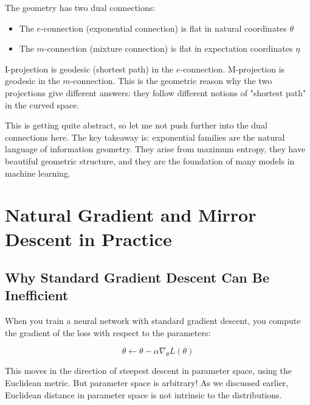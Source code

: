 \vspace{1em}

The geometry has two dual connections:

\begin{itemize}
\item The $e$-connection (exponential connection) is flat in natural coordinates $\theta$

\item The $m$-connection (mixture connection) is flat in expectation coordinates $\eta$
\end{itemize}

I-projection is geodesic (shortest path) in the $e$-connection. M-projection is geodesic in the $m$-connection. This is the geometric reason why the two projections give different answers: they follow different notions of "shortest path" in the curved space.

\vspace{1.5em}

This is getting quite abstract, so let me not push further into the dual connections here. The key takeaway is: exponential families are the natural language of information geometry. They arise from maximum entropy, they have beautiful geometric structure, and they are the foundation of many models in machine learning.

\vspace{2em}

\section{Natural Gradient and Mirror Descent in Practice}

\subsection{Why Standard Gradient Descent Can Be Inefficient}

When you train a neural network with standard gradient descent, you compute the gradient of the loss with respect to the parameters:

\begin{equation}
\theta \leftarrow \theta - \alpha \nabla_\theta L(\theta)
\end{equation}

This moves in the direction of steepest descent in parameter space, using the Euclidean metric. But parameter space is arbitrary! As we discussed earlier, Euclidean distance in parameter space is not intrinsic to the distributions.

